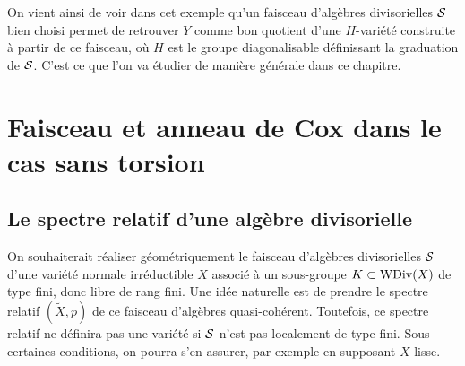 On vient ainsi de voir dans cet exemple qu'un faisceau d'algèbres divisorielles $\mathcal{S}$ bien choisi permet de retrouver $Y$ comme bon quotient d'une $H$-variété construite à partir de ce faisceau, où $H$ est le groupe diagonalisable définissant la graduation de $\mathcal{S}$. C'est ce que l'on va étudier de manière générale dans ce chapitre.

\section{Faisceau et anneau de Cox dans le cas sans torsion}

\subsection{Le spectre relatif d'une algèbre divisorielle}


On souhaiterait réaliser géométriquement le faisceau d'algèbres divisorielles $\mathcal{S}$ d'une variété normale irréductible $X$ associé à un sous-groupe $K\subset \operatorname{WDiv}(X)$ de type fini, donc libre de rang fini. Une idée naturelle est de prendre le spectre relatif $(\widetilde{X}, p)$ de ce faisceau d'algèbres quasi-cohérent. Toutefois, ce spectre relatif ne définira pas une variété si $\mathcal{S}$ n'est pas localement de type fini. Sous certaines conditions, on pourra s'en assurer, par exemple en supposant $X$ lisse.

